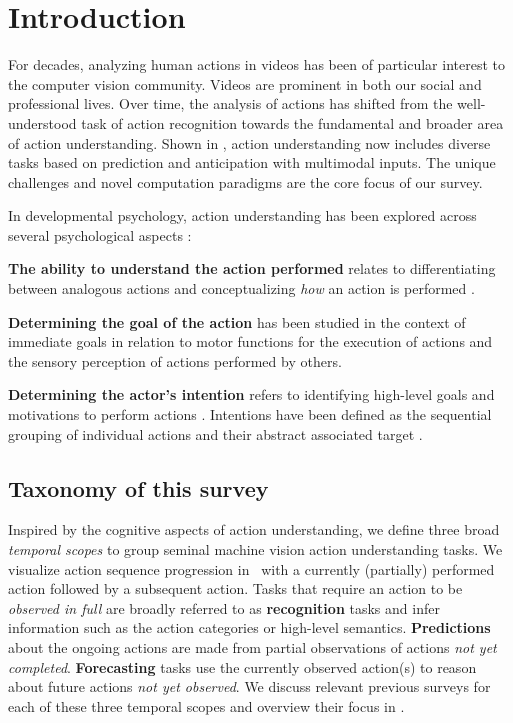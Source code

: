 \section{Introduction}
\label{sec:intro}

For decades, analyzing human actions in videos has been of particular interest to the computer vision community. Videos are prominent in both our social and professional lives. Over time, the analysis of actions has shifted from the well-understood task of action recognition towards the fundamental and broader area of action understanding. Shown in , action understanding now includes diverse tasks based on prediction and anticipation with multimodal inputs. The unique challenges and novel computation paradigms are the core focus of our survey. 

In developmental psychology, action understanding has been explored across several psychological aspects : 

\noindent
\textbf{The ability to understand the action performed} relates to differentiating between analogous actions  and conceptualizing \emph{how} an action is performed . 

\noindent
\textbf{Determining the goal of the action} has been studied in the context of immediate goals  in relation to motor functions for the execution of actions and the sensory perception of actions performed by others.

\noindent
\textbf{Determining the actor's intention} refers to identifying high-level goals and motivations to perform actions . Intentions have been defined as the sequential grouping of individual actions  and their abstract associated target .


\subsection{Taxonomy of this survey}
\label{sec:intro::taxonomy}

Inspired by the cognitive aspects of action understanding, we define three broad \emph{temporal scopes} to group seminal machine vision action understanding tasks. We visualize action sequence progression in~ with a currently (partially) performed action followed by a subsequent action. Tasks that require an action to be \emph{observed in full} are broadly referred to as \textbf{recognition} tasks and infer information such as the action categories or high-level semantics. \textbf{Predictions} about the ongoing actions are made from partial observations of actions \emph{not yet completed}. \textbf{Forecasting} tasks use the currently observed action(s) to reason about future actions \emph{not yet observed}. We discuss relevant previous surveys for each of these three temporal scopes and overview their focus in .

